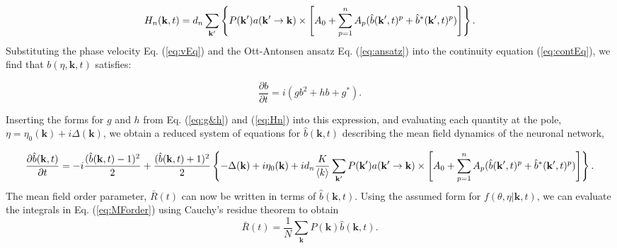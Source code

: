 \documentclass[%
 aip,
 sd,%
 amsmath,amssymb,
 reprint,%
]{revtex4-1}
\begin{document}
\begin{dmath} \label{eq:Hn}
H_n(\mathbf{k}, t) = d_n \sum_{\mathbf{k'}}\left\{ P(\mathbf{k'}) a({\mathbf{k'} \rightarrow \mathbf{k}}) \\ \times \left[ A_0 + \sum_{p=1}^n A_p (\hat b(\mathbf{k'}, t)^p + \hat b^*(\mathbf{k'}, t)^p) \right] \right\}.
\end{dmath}
Substituting the phase velocity Eq. (\ref{eq:vEq}) and the Ott-Antonsen ansatz Eq. (\ref{eq:ansatz}) into the continuity equation (\ref{eq:contEq}), we find that $b(\eta, \mathbf{k}, t)$ satisfies:

\begin{equation} \label{eq:beq}
\frac{\partial b}{\partial t} = i (g b^2 + h b + g^*).
\end{equation}

Inserting the forms for $g$ and $h$ from Eq. (\ref{eq:g&h}) and (\ref{eq:Hn}) into this expression, and evaluating each quantity at the pole, $\eta = \eta_0(\mathbf{k}) + i \Delta(\mathbf{k})$, we obtain a reduced system of equations for $\hat b(\mathbf{k}, t)$ describing the mean field dynamics of the neuronal network, 

\begin{dmath}\label{eq:reducedeqn}
\frac{\partial{\hat b(\mathbf{k}, t)}}{\partial t} = -i \frac{(\hat b(\mathbf{k}, t)-1)^2}{2} + \frac{ (\hat b(\mathbf{k}, t) + 1)^2}{2} \left\{-\Delta(\mathbf{k}) + i \eta_0(\mathbf{k}) + i d_n \frac{K}{\langle k \rangle} \sum_{\mathbf{k'}} P(\mathbf{k'}) a({\mathbf{k'} \rightarrow \mathbf{k}}) \\ \times  \left[ A_0 + \sum_{p=1}^n A_p (\hat b(\mathbf{k'}, t)^p + \hat b^*(\mathbf{k'}, t)^p) \right]\right\}.
\end{dmath}
The mean field order parameter, $\bar{R}(t)$ can now be written in terms of $\hat b(\mathbf{k},t)$. Using the assumed form for $f(\theta,\eta|\mathbf{k},t)$, we can evaluate the integrals in Eq. (\ref{eq:MForder}) using Cauchy's residue theorem to obtain
\begin{equation} \label{eq:MForder2}
\bar{R}(t) = \frac{1}{N} \sum_{\mathbf{k}} P(\mathbf{k}) \hat b(\mathbf{k},t).
\end{equation}
\end{document}
